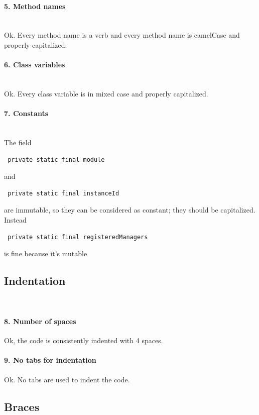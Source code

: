 \documentclass[english]{article}
\begin{document}
\paragraph{5. Method names}\\
Ok. Every method name is a verb and every method name is camelCase and properly capitalized.

\paragraph{6. Class variables}\\
Ok. Every class variable is in mixed case and properly capitalized.

\paragraph{7. Constants}\\
The field \begin{lstlisting} private static final module \end{lstlisting} and \begin{lstlisting} private static final instanceId \end{lstlisting} are immutable, 
so they can be considered as constant; they should be capitalized. Instead \begin{lstlisting} private static final registeredManagers \end{lstlisting} is fine because it's mutable


\subsection{Indentation}\\

\paragraph{8. Number of spaces}
Ok, the code is consistently indented with 4 spaces.

\paragraph{9. No tabs for indentation}
Ok. No tabs are used to indent the code.

\subsection{Braces}
\end{document}
